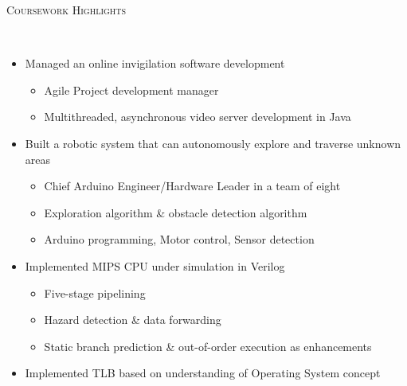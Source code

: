 \documentclass[a4paper, 12pt]{article}
\newenvironment{changemargin}[2]{%
  \begin{list}{}{%
      \setlength{\topsep}{0pt}%
      \setlength{\leftmargin}{#1}%
      \setlength{\rightmargin}{#2}%
      \setlength{\listparindent}{\parindent}%
      \setlength{\itemindent}{\parindent}%
      \setlength{\parsep}{\parskip}%
    }%
  \item[]}{\end{list}
}
\newcommand{\lineover}{
  \begin{changemargin}{-0.05in}{-0.05in}
    \vspace*{-8pt}
    \hrulefill \\
    \vspace*{-2pt}
  \end{changemargin}
}
\newcommand{\header}[1]{
  \begin{changemargin}{-0.5in}{-0.5in}
    \scshape{#1}\\
    \lineover
  \end{changemargin}
}
\newenvironment{body}
{
\vspace*{-16pt}
\begin{changemargin}{-0.25in}{-0.5in}
}	
{
\end{changemargin}
}
\begin{document}
%
%
%
%
\smallskip
\medskip
\header{Coursework Highlights}
\begin{body}
  \vspace{14pt}
  \begin{itemize} \itemsep 1pt
  \item Managed an online invigilation software development
    \begin{itemize} \itemsep -0pt \small
        \item Agile Project development manager
        \item Multithreaded, asynchronous video server development in Java
    \end{itemize}
  \item Built a robotic system that can autonomously explore and traverse unknown areas
    \begin{itemize} \itemsep -0pt \small
        \item Chief Arduino Engineer/Hardware Leader in a team of eight
        \item Exploration algorithm \& obstacle detection algorithm
        \item Arduino programming, Motor control, Sensor detection
    \end{itemize}
  \item Implemented MIPS CPU under simulation in Verilog
    \begin{itemize} \itemsep -0pt \small
        \item Five-stage pipelining
        \item Hazard detection \& data forwarding
        \item Static branch prediction \& out-of-order execution as enhancements
    \end{itemize}
  \item Implemented TLB based on understanding of Operating System concept

\end{itemize}
\end{body}
\end{document}

